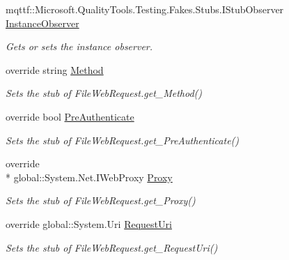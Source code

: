 \begin{DoxyCompactItemize}
mqttf\-::\-Microsoft.\-Quality\-Tools.\-Testing.\-Fakes.\-Stubs.\-I\-Stub\-Observer \hyperlink{class_system_1_1_net_1_1_fakes_1_1_stub_file_web_request_a2da4910218db26e36161bd9980a5334d}{Instance\-Observer}
\begin{DoxyCompactList}\small\item\em Gets or sets the instance observer.\end{DoxyCompactList}\item 
override string \hyperlink{class_system_1_1_net_1_1_fakes_1_1_stub_file_web_request_a955364fd0342111c27ee135baba3773c}{Method}
\begin{DoxyCompactList}\small\item\em Sets the stub of File\-Web\-Request.\-get\-\_\-\-Method()\end{DoxyCompactList}\item 
override bool \hyperlink{class_system_1_1_net_1_1_fakes_1_1_stub_file_web_request_ae3397bf1478ee278d848a7bd88c8c11a}{Pre\-Authenticate}
\begin{DoxyCompactList}\small\item\em Sets the stub of File\-Web\-Request.\-get\-\_\-\-Pre\-Authenticate()\end{DoxyCompactList}\item 
override \\*
global\-::\-System.\-Net.\-I\-Web\-Proxy \hyperlink{class_system_1_1_net_1_1_fakes_1_1_stub_file_web_request_a089f51a9610862989e4e08e6c76f996b}{Proxy}
\begin{DoxyCompactList}\small\item\em Sets the stub of File\-Web\-Request.\-get\-\_\-\-Proxy()\end{DoxyCompactList}\item 
override global\-::\-System.\-Uri \hyperlink{class_system_1_1_net_1_1_fakes_1_1_stub_file_web_request_a2d71be5a0c17cd1d903d177897a880d8}{Request\-Uri}
\begin{DoxyCompactList}\small\item\em Sets the stub of File\-Web\-Request.\-get\-\_\-\-Request\-Uri()\end{DoxyCompactList}\item 

\end{DoxyCompactItemize}
